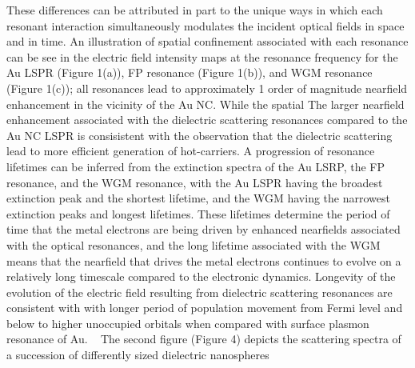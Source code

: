 \documentclass[journal=jpclcd,manuscript=letter]{achemso}
\begin{document}
These differences can be attributed in part to the unique ways in which each resonant interaction simultaneously modulates the incident optical
fields in space and in time. An illustration of spatial confinement associated with each resonance can be see in the 
electric field intensity maps at the resonance frequency for the 
Au LSPR (Figure 1(a)), FP resonance (Figure 1(b)), and WGM resonance (Figure 1(c)); all resonances lead to approximately 1 order of
magnitude nearfield enhancement in the vicinity of the Au NC.  While the spatial 
The larger nearfield enhancement associated with the dielectric scattering resonances
compared to the Au NC LSPR is consisistent with the observation that the dielectric scattering lead to more efficient generation
of hot-carriers. A progression of resonance lifetimes can be inferred from the extinction spectra of the Au LSRP, the FP resonance, and the WGM resonance, with 
the Au LSPR having the broadest extinction peak and the shortest lifetime, and the WGM having the narrowest extinction peaks and longest lifetimes.  These
lifetimes determine the period of time that the metal electrons are being driven by enhanced nearfields associated with the optical resonances, and
the long lifetime associated with the WGM means that the nearfield that drives the metal electrons continues to evolve on a relatively long timescale compared
to the electronic dynamics. 
Longevity of the evolution of the electric field resulting from dielectric scattering resonances are consistent with 
with longer period of population movement from Fermi level and below to higher unoccupied orbitals when compared with surface plasmon 
resonance of Au.  
 	
The second figure (Figure 4) depicts the scattering spectra of a succession of differently sized dielectric nanospheres 
\end{document}
